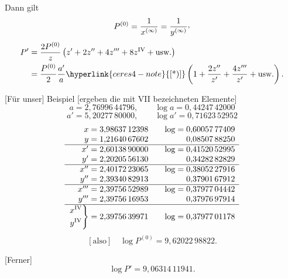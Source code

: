 \hypertarget{native-391}{}Dann gilt
\[
P^{(0)}=\frac1{x^{(\infty)}}=\frac1{y^{(\infty)}}\mathpunct{\text{\raisebox{.45ex}{,}}}
\]
\[
\begin{aligned}
P'&=\frac{2P^{(0)}}z\left(z'+2z''+4z'''+8z^{\mathrm{IV}}+\text{usw.}\right)\\
&=\frac{P^{(0)}}2\frac{a'}a\hyperlink{ceres4-note}{\text{[*)]}}\left(1+\frac{2z''}{z'}+\frac{4z'''}{z'}+\text{usw.}\right).
\end{aligned}
\]
\begingroup
\makeatletter
\long\def\@makefntext#1{\noindent[*)] #1}
\makeatother
{}
\endgroup

[Für unser] Beispiel [ergeben die mit VII bezeichneten Elemente]
\[
a=2{,}76996\,44796,\qquad\log a=0{,}44247\,42000
\]
\noindent[und]
\[
a'=5{,}20277\,80000,\qquad\log a'=0{,}71623\,52952
\]
\[
\begin{array}{r@{\;}l@{\qquad}r@{\;}l}
x&=3{,}98637\,12398&\log=&0{,}60057\,77409\\
y&=1{,}21640\,67602&&0{,}08507\,88250\\\hline
x'&=2{,}60138\,90000&\log=&0{,}41520\,52995\\
y'&=2{,}20205\,56130&&0{,}34282\,82829\\\hline
x''&=2{,}40172\,23065&\log=&0{,}38052\,27916\\
y''&=2{,}39340\,82913&&0{,}37901\,67912\\\hline
x'''&=2{,}39756\,52989&\log=&0{,}37977\,04442\\
y'''&=2{,}39756\,16953&&0{,}37976\,97914\\\hline
\left.\begin{gathered}x^{\mathrm{IV}}\\y^{\mathrm{IV}}\end{gathered}\right\}&=2{,}39756\,39971&\log=&0{,}37977\,01178
\end{array}
\]
\[
[\text{also}]\quad\log P^{(0)}=9{,}62022\,98822.
\]

[Ferner]
\[
\log P'=9{,}06314\,11941.
\]

